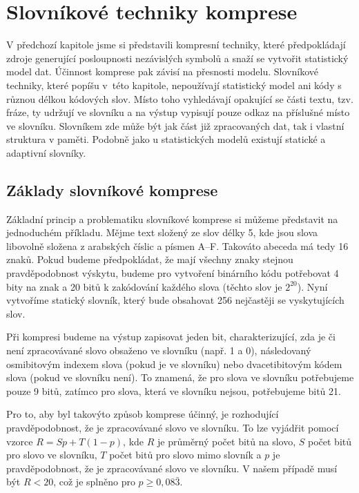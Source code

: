 \chapter{Slovníkové techniky komprese}
\label{kapitolaSlovnikovaKomprese}
V předchozí kapitole jsme si představili kompresní techniky, které předpokládají zdroje generující posloupnosti nezávislých symbolů a snaží se vytvořit statistický model dat. Účinnost komprese pak závisí  na přesnosti modelu. Slovníkové techniky, které popíšu v~této kapitole, nepoužívají statistický model ani kódy s různou délkou kódových slov. Místo toho vyhledávají opakující se části textu, tzv. fráze, ty udržují ve slovníku a na výstup vypisují pouze odkaz na příslušné místo ve slovníku. Slovníkem zde může být jak část již zpracovaných dat, tak i vlastní struktura v paměti. Podobně jako u statistických modelů existují statické a adaptivní slovníky.

\section{Základy slovníkové komprese}
Základní princip a problematiku slovníkové komprese si můžeme představit na jednoduchém příkladu. Mějme text složený ze slov délky 5, kde jsou slova libovolně složena z arabských číslic a písmen A--F. Takováto abeceda má tedy 16 znaků. Pokud budeme předpokládat, že mají všechny znaky stejnou pravděpodobnost výskytu, budeme pro vytvoření binárního kódu potřebovat 4 bity na znak a 20 bitů k zakódování každého slova (těchto slov je $2^{20}$). Nyní vytvoříme statický slovník, který bude obsahovat 256 nejčastěji se vyskytujících slov.

Při kompresi budeme na výstup zapisovat jeden bit, charakterizující, zda je či není zpracovávané slovo obsaženo ve slovníku (např. 1 a 0), následovaný osmibitovým indexem slova (pokud je ve slovníku) nebo dvacetibitovým kódem slova (pokud ve slovníku není). To znamená, že pro slova ve slovníku potřebujeme pouze 9 bitů, zatímco pro slova, která ve slovníku nejsou, potřebujeme bitů 21.

Pro to, aby byl takovýto způsob komprese účinný, je rozhodující pravděpodobnost, že je zpracovávané slovo ve slovníku. To lze vyjádřit pomocí vzorce $R = Sp + T(1-p)$, kde $R$ je průměrný počet bitů na slovo, $S$ počet bitů pro slovo ve slovníku, $T$ počet bitů pro slovo mimo slovník a $p$ je pravděpodobnost, že je zpracovávané slovo ve slovníku. V našem případě musí být $R < 20$, což je splněno pro $p\geq 0,08\bar{3}$.


